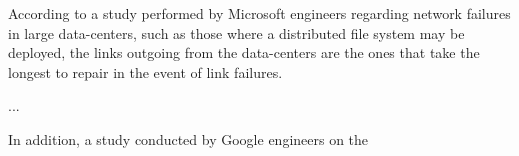 According to a study \cite{DBLP:conf/sigcomm/GillJN11} performed by Microsoft engineers regarding network failures in large data-centers, such as those where a distributed file system may be deployed, the links outgoing from the data-centers are the ones that take the longest to repair in the event of link failures.


...

In addition, a study \cite{DBLP:conf/osdi/FordLPSTBGQ10} conducted by Google engineers on the 